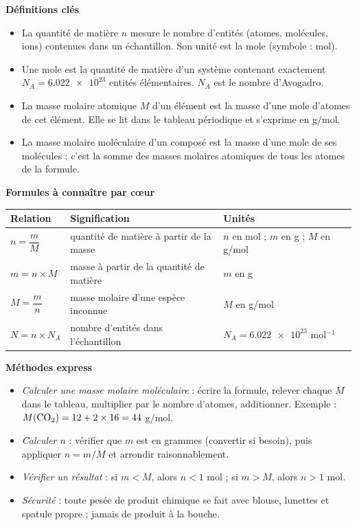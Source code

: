 \documentclass[11pt]{article}
\newcommand{\cle}[1]{{\popxbold\color{popdark}#1}}
\begin{document}
\begin{bilan}
\textbf{Définitions clés}
\begin{itemize}
  \item La \cle{quantité de matière} $n$ mesure le nombre d'entités (atomes, molécules, ions) contenues dans un échantillon. Son unité est la \cle{mole} (symbole : mol).
  \item Une \cle{mole} est la quantité de matière d'un système contenant exactement $N_A = \num{6,022e23}$ entités élémentaires. $N_A$ est le \cle{nombre d'Avogadro}.
  \item La \cle{masse molaire atomique} $M$ d'un élément est la masse d'une mole d'atomes de cet élément. Elle se lit dans le tableau périodique et s'exprime en \si{g/mol}.
  \item La \cle{masse molaire moléculaire} d'un composé est la masse d'une mole de ses molécules : c'est la somme des masses molaires atomiques de tous les atomes de la formule.
\end{itemize}

\textbf{Formules à connaître par cœur}
\begin{center}
\begin{tabularx}{\linewidth}{|l|X|l|}
\hline
\rowcolor{popblueL} \textbf{Relation} & \textbf{Signification} & \textbf{Unités} \\
\hline
$n = \dfrac{m}{M}$ & quantité de matière à partir de la masse & $n$ en mol ; $m$ en g ; $M$ en \si{g/mol} \\
\hline
$m = n \times M$ & masse à partir de la quantité de matière & $m$ en g \\
\hline
$M = \dfrac{m}{n}$ & masse molaire d'une espèce inconnue & $M$ en \si{g/mol} \\
\hline
$N = n \times N_A$ & nombre d'entités dans l'échantillon & $N_A = \num{6,022e23}$ mol$^{-1}$ \\
\hline
\end{tabularx}
\end{center}

\textbf{Méthodes express}
\begin{itemize}
  \item \emph{Calculer une masse molaire moléculaire} : écrire la formule, relever chaque $M$ dans le tableau, multiplier par le nombre d'atomes, additionner. Exemple : $M(\ce{CO2}) = 12 + 2 \times 16 = 44$ \si{g/mol}.
  \item \emph{Calculer $n$} : vérifier que $m$ est en grammes (convertir si besoin), puis appliquer $n = m/M$ et arrondir raisonnablement.
  \item \emph{Vérifier un résultat} : si $m < M$, alors $n < 1$ mol ; si $m > M$, alors $n > 1$ mol.
  \item \emph{Sécurité} : toute pesée de produit chimique se fait avec blouse, lunettes et spatule propre ; jamais de produit à la bouche.
\end{itemize}
\end{bilan}
\end{document}
